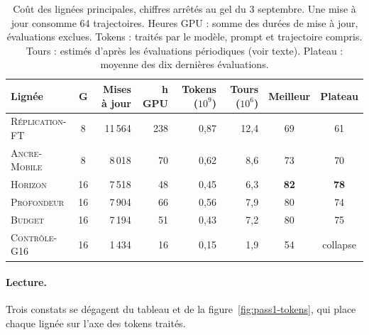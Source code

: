 \documentclass[11pt,a4paper]{article}
\begin{document}
\begin{table}[htbp]
\centering
\caption{Coût des lignées principales, chiffres arrêtés au gel du 3 septembre. Une mise à jour consomme 64 trajectoires. Heures GPU : somme des durées de mise à jour, évaluations exclues. Tokens : traités par le modèle, prompt et trajectoire compris. Tours : estimés d'après les évaluations périodiques (voir texte). Plateau : moyenne des dix dernières évaluations.}
\label{tab:compute}
\footnotesize
\setlength{\tabcolsep}{4pt}
\begin{tabular}{l c r r r r c c}
\toprule
\textbf{Lignée} & $\boldsymbol{G}$ & \textbf{Mises à jour} & \textbf{h GPU} & \textbf{Tokens ($10^9$)} & \textbf{Tours ($10^6$)} & \textbf{Meilleur} & \textbf{Plateau} \\
\midrule
\textsc{Réplication-FT} & 8 & 11\,564 & 238 & 0{,}87 & 12{,}4 & 69 & 61 \\
\textsc{Ancre-Mobile} & 8 & 8\,018 & 70 & 0{,}62 & 8{,}6 & 73 & 70 \\
\textsc{Horizon} & 16 & 7\,518 & 48 & 0{,}45 & 6{,}3 & \textbf{82} & \textbf{78} \\
\textsc{Profondeur} & 16 & 7\,904 & 66 & 0{,}56 & 7{,}9 & 80 & 74 \\
\textsc{Budget} & 16 & 7\,194 & 51 & 0{,}43 & 7{,}2 & 80 & 75 \\
\textsc{Contrôle-G16} & 16 & 1\,434 & 16 & 0{,}15 & 1{,}9 & 54 & collapse \\
\bottomrule
\end{tabular}
\end{table}

\paragraph{Lecture.} Trois constats se dégagent du tableau et de la figure~\ref{fig:pass1-tokens}, qui place chaque lignée sur l'axe des tokens traités.
\end{document}

